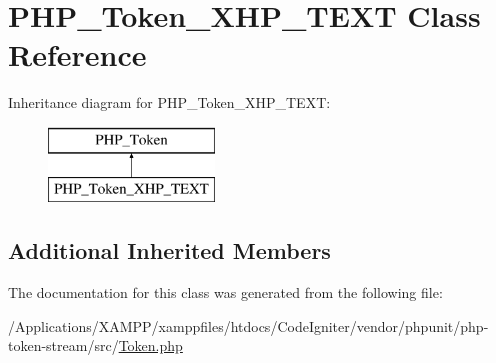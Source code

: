 \hypertarget{class_p_h_p___token___x_h_p___t_e_x_t}{}\section{P\+H\+P\+\_\+\+Token\+\_\+\+X\+H\+P\+\_\+\+T\+E\+XT Class Reference}
\label{class_p_h_p___token___x_h_p___t_e_x_t}
Inheritance diagram for P\+H\+P\+\_\+\+Token\+\_\+\+X\+H\+P\+\_\+\+T\+E\+XT\+:\begin{figure}[H]
\begin{center}
\leavevmode
\includegraphics[height=2.000000cm]{class_p_h_p___token___x_h_p___t_e_x_t}
\end{center}
\end{figure}
\subsection*{Additional Inherited Members}


The documentation for this class was generated from the following file\+:\begin{DoxyCompactItemize}
\item 
/\+Applications/\+X\+A\+M\+P\+P/xamppfiles/htdocs/\+Code\+Igniter/vendor/phpunit/php-\/token-\/stream/src/\mbox{\hyperlink{_token_8php}{Token.\+php}}\end{DoxyCompactItemize}
